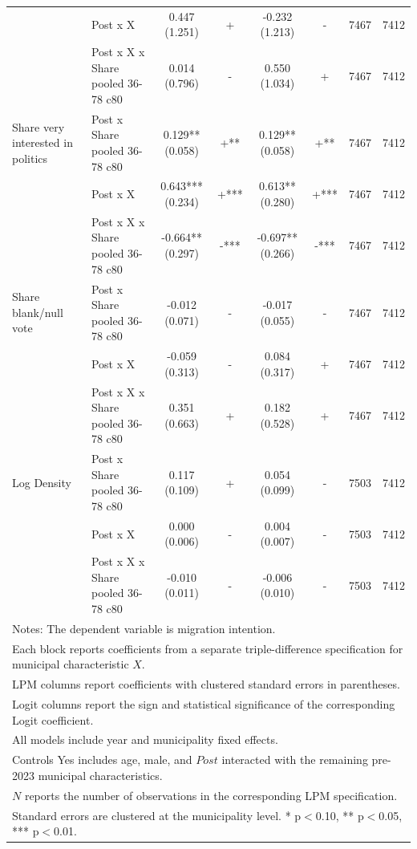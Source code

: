 \begin{table}[!htbp]
\begin{tabular}{llcccccc}
 & Post x X & 0.447 (1.251) & + & -0.232 (1.213) & - & 7467 & 7412 \\
 & Post x X x Share pooled 36-78 c80 & 0.014 (0.796) & - & 0.550 (1.034) & + & 7467 & 7412 \\
\hline
Share very interested in politics & Post x Share pooled 36-78 c80 & 0.129** (0.058) & +** & 0.129** (0.058) & +** & 7467 & 7412 \\
 & Post x X & 0.643*** (0.234) & +*** & 0.613** (0.280) & +*** & 7467 & 7412 \\
 & Post x X x Share pooled 36-78 c80 & -0.664** (0.297) & -*** & -0.697** (0.266) & -*** & 7467 & 7412 \\
\hline
Share blank/null vote & Post x Share pooled 36-78 c80 & -0.012 (0.071) & - & -0.017 (0.055) & - & 7467 & 7412 \\
 & Post x X & -0.059 (0.313) & - & 0.084 (0.317) & + & 7467 & 7412 \\
 & Post x X x Share pooled 36-78 c80 & 0.351 (0.663) & + & 0.182 (0.528) & + & 7467 & 7412 \\
\hline
Log Density & Post x Share pooled 36-78 c80 & 0.117 (0.109) & + & 0.054 (0.099) & - & 7503 & 7412 \\
 & Post x X & 0.000 (0.006) & - & 0.004 (0.007) & - & 7503 & 7412 \\
 & Post x X x Share pooled 36-78 c80 & -0.010 (0.011) & - & -0.006 (0.010) & - & 7503 & 7412 \\
\hline
\multicolumn{8}{l}{\footnotesize Notes: The dependent variable is migration intention.} \\
\multicolumn{8}{l}{\footnotesize Each block reports coefficients from a separate triple-difference specification for municipal characteristic $X$.} \\
\multicolumn{8}{l}{\footnotesize LPM columns report coefficients with clustered standard errors in parentheses.} \\
\multicolumn{8}{l}{\footnotesize Logit columns report the sign and statistical significance of the corresponding Logit coefficient.} \\
\multicolumn{8}{l}{\footnotesize All models include year and municipality fixed effects.} \\
\multicolumn{8}{l}{\footnotesize Controls Yes includes age, male, and $Post$ interacted with the remaining pre-2023 municipal characteristics.} \\
\multicolumn{8}{l}{\footnotesize $N$ reports the number of observations in the corresponding LPM specification.} \\
\multicolumn{8}{l}{\footnotesize Standard errors are clustered at the municipality level. * p$<$0.10, ** p$<$0.05, *** p$<$0.01.} \\
\end{tabular}
\end{table}
